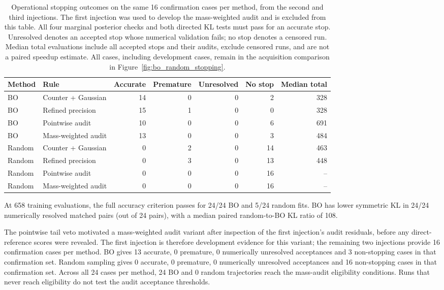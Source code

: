 \begin{table}\centering
\caption{Operational stopping outcomes on the same 16 confirmation cases per
method, from the second and third injections. The first injection was used to
develop the mass-weighted audit and is excluded from this table.
All four marginal posterior checks and both directed KL tests must pass for
an accurate stop. Unresolved denotes an accepted stop whose numerical
validation fails; no stop denotes a censored run. Median total evaluations
include all accepted stops and their audits, exclude censored runs, and are
not a paired speedup estimate. All cases, including development cases, remain
in the acquisition comparison in Figure~\ref{fig:bo_random_stopping}.}
\label{tab:operational_stopping}
\begin{tabular}{llrrrrr}\toprule
Method & Rule & Accurate & Premature & Unresolved & No stop & Median total\\
\midrule
BO & Counter + Gaussian & 14 & 0 & 0 & 2 & 328 \\
BO & Refined precision & 15 & 1 & 0 & 0 & 328 \\
BO & Pointwise audit & 10 & 0 & 0 & 6 & 691 \\
BO & Mass-weighted audit & 13 & 0 & 0 & 3 & 484 \\
Random & Counter + Gaussian & 0 & 2 & 0 & 14 & 463 \\
Random & Refined precision & 0 & 3 & 0 & 13 & 448 \\
Random & Pointwise audit & 0 & 0 & 0 & 16 & -- \\
Random & Mass-weighted audit & 0 & 0 & 0 & 16 & -- \\
\bottomrule\end{tabular}\end{table}

At 658 training evaluations, the full accuracy criterion passes for 24/24 BO and 5/24 random fits. BO has lower symmetric KL in 24/24 numerically resolved matched pairs (out of 24 pairs), with a median paired random-to-BO KL ratio of 108.

The pointwise tail veto motivated a mass-weighted audit variant after inspection
of the first injection's audit residuals, before any direct-reference scores
were revealed. The first injection is therefore development evidence for this
variant; the remaining two injections provide 16 confirmation cases per method.
BO gives 13 accurate, 0 premature, 0 numerically unresolved acceptances and 3 non-stopping cases in that confirmation set.
Random sampling gives 0 accurate, 0 premature, 0 numerically unresolved acceptances and 16 non-stopping cases in that confirmation set.
Across all 24 cases per method, 24 BO and 0 random trajectories reach the mass-audit eligibility conditions. Runs that never reach eligibility do not test the audit acceptance thresholds.

